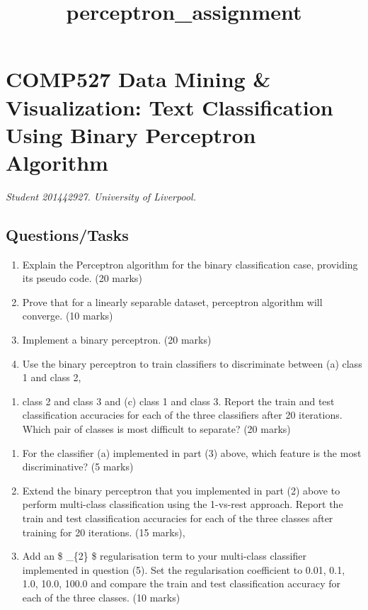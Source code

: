 \documentclass[11pt]{article}
\title{perceptron\_assignment}
\providecommand{\tightlist}{%
      \setlength{\itemsep}{0pt}\setlength{\parskip}{0pt}}
\begin{document}
    
    \maketitle
    
    

    
    \hypertarget{comp527-data-mining-visualization-text-classification-using-binary-perceptron-algorithm}{%
\section{COMP527 Data Mining \& Visualization: Text Classification Using
Binary Perceptron
Algorithm}\label{comp527-data-mining-visualization-text-classification-using-binary-perceptron-algorithm}}

    \emph{Student 201442927. University of Liverpool.}

    \hypertarget{questionstasks}{%
\subsection{Questions/Tasks}\label{questionstasks}}

    \begin{enumerate}
\def\labelenumi{(\arabic{enumi})}
\item
  Explain the Perceptron algorithm for the binary classification case,
  providing its pseudo code. (20 marks)
\item
  Prove that for a linearly separable dataset, perceptron algorithm will
  converge. (10 marks)
\item
  Implement a binary perceptron. (20 marks)
\item
  Use the binary perceptron to train classifiers to discriminate between
  (a) class 1 and class 2,
\end{enumerate}

\begin{enumerate}
\def\labelenumi{(\alph{enumi})}
\setcounter{enumi}{1}
\tightlist
\item
  class 2 and class 3 and (c) class 1 and class 3. Report the train and
  test classification accuracies for each of the three classifiers after
  20 iterations. Which pair of classes is most difficult to separate?
  (20 marks)
\end{enumerate}

\begin{enumerate}
\def\labelenumi{(\arabic{enumi})}
\setcounter{enumi}{4}
\item
  For the classifier (a) implemented in part (3) above, which feature is
  the most discriminative? (5 marks)
\item
  Extend the binary perceptron that you implemented in part (2) above to
  perform multi-class classification using the 1-vs-rest approach.
  Report the train and test classification accuracies for each of the
  three classes after training for 20 iterations. (15 marks),
\item
  Add an \$ \ell\_\{2\} \$ regularisation term to your multi-class
  classifier implemented in question (5). Set the regularisation
  coefficient to 0.01, 0.1, 1.0, 10.0, 100.0 and compare the train and
  test classification accuracy for each of the three classes. (10 marks)
\end{enumerate}
\end{document}
